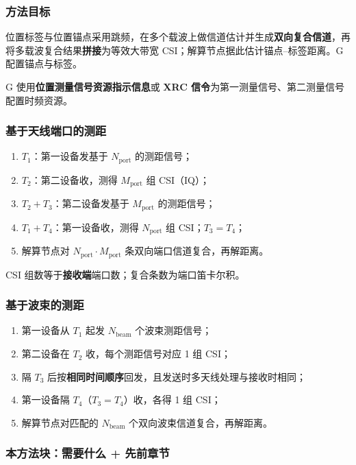 \documentclass[11pt,a4paper]{ctexart}
\begin{document}
\subsubsection*{方法目标}

位置标签与位置锚点采用跳频，在多个载波上做信道估计并生成\textbf{双向复合信道}，再将多载波复合结果\textbf{拼接}为等效大带宽 CSI；解算节点据此估计锚点--标签距离。G 配置锚点与标签。

G 使用\textbf{位置测量信号资源指示信息}或 \textbf{XRC 信令}为第一测量信号、第二测量信号配置时频资源。

\subsubsection*{基于天线端口的测距}

\begin{enumerate}[nosep]
  \item $T_1$：第一设备发基于 $N_{\mathrm{port}}$ 的测距信号；
  \item $T_2$：第二设备收，测得 $M_{\mathrm{port}}$ 组 CSI（IQ）；
  \item $T_2+T_3$：第二设备发基于 $M_{\mathrm{port}}$ 的测距信号；
  \item $T_1+T_4$：第一设备收，测得 $N_{\mathrm{port}}$ 组 CSI；\textbf{$T_3=T_4$}；
  \item 解算节点对 $N_{\mathrm{port}}\cdot M_{\mathrm{port}}$ 条双向端口信道复合，再解距离。
\end{enumerate}

CSI 组数等于\textbf{接收端}端口数；复合条数为端口笛卡尔积。

\subsubsection*{基于波束的测距}

\begin{enumerate}[nosep]
  \item 第一设备从 $T_1$ 起发 $N_{\mathrm{beam}}$ 个波束测距信号；
  \item 第二设备在 $T_2$ 收，每个测距信号对应 1 组 CSI；
  \item 隔 $T_3$ 后按\textbf{相同时间顺序}回发，且发送时多天线处理与接收时相同；
  \item 第一设备隔 $T_4$（$T_3=T_4$）收，各得 1 组 CSI；
  \item 解算节点对匹配的 $N_{\mathrm{beam}}$ 个双向波束信道复合，再解距离。
\end{enumerate}

\subsubsection*{本方法块：需要什么 + 先前章节}
\end{document}
